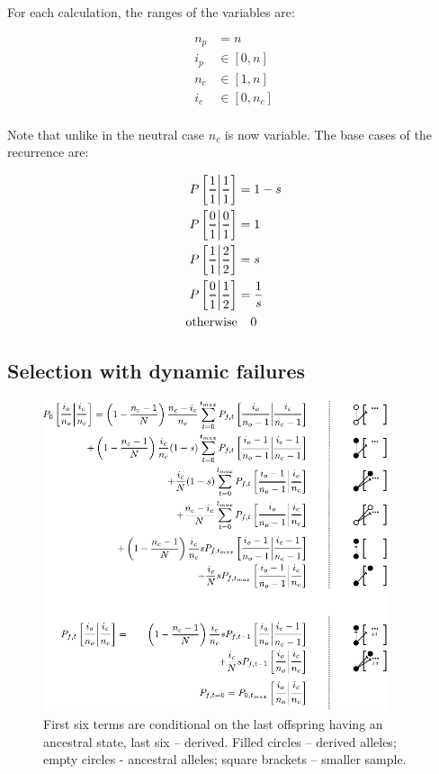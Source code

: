\documentclass[review]{elsarticle}
\newcommand{\Dfrac}[2]{%
  \ooalign{%
    $\genfrac{}{}{1.2pt}0{#1}{#2}$\cr%
    $\color{white}\genfrac{}{}{.4pt}0{\phantom{#1}}{\phantom{#2}}$}%
}
\newcommand{\cond}{\middle\vert}
\begin{document}
For each calculation, the ranges of the variables are:

\begin{equation}
  \begin{aligned}
    n_p &= n \\
    i_p &\in [0, n] \\
    n_c &\in [1, n] \\
    i_c &\in [0, n_c] \\
  \end{aligned}
\end{equation}

Note that unlike in the neutral case $n_c$ is now variable. The base cases of the recurrence are:

\begin{equation*}
  \begin{aligned}
    P\left[ \Dfrac{1}{1} \cond \Dfrac{1}{1} \right] &= 1-s \\
    P\left[ \Dfrac{0}{1} \cond \Dfrac{0}{1} \right] &= 1 \\
    P\left[ \Dfrac{1}{1} \cond \Dfrac{2}{2} \right] &= s \\
    P\left[ \Dfrac{0}{1} \cond \Dfrac{1}{2} \right] &= \frac{1}{s} \\
    \text{otherwise} &\phantom{{}=} 0
  \end{aligned}
\end{equation*}

\subsection{Selection with dynamic failures}

\begin{figure}
  \centering
  \includegraphics[width=0.9\textwidth]{fig/recurrence-selection-dynamic-failures-annotated.pdf}
  \caption{First six terms are conditional on the last
    offspring having an ancestral state, last six -- derived. Filled circles -- derived alleles;
    empty circles - ancestral alleles; square brackets -- smaller sample.}
  \label{fig:rec-selection}
\end{figure}
\end{document}
